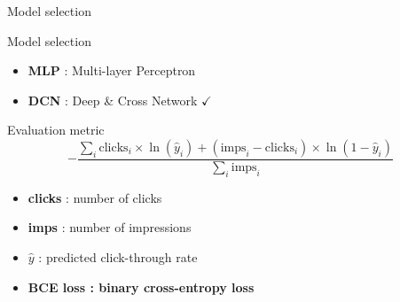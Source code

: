 \documentclass[compress,xcolor=table]{beamer}
\begin{document}
\begin{frame}{Model selection}
	\begin{block}{Model selection}
		\begin{itemize}
			\item \textbf{MLP} : Multi-layer Perceptron \XSolidBrush
			\item \textbf{DCN} : Deep \& Cross Network $\checkmark$
		\end{itemize}
	\end{block}
	\begin{block}{Evaluation metric}
		\begin{equation}
			-\frac{\sum_{i}{\text{clicks}_i \times \ln(\hat{y}_i) + (\text{imps}_i - \text{clicks}_i) \times \ln(1 - \hat{y}_i)}}{\sum_{i}{\text{imps}_i}}
		\end{equation}
		\begin{itemize}
			\item \textbf{clicks} : number of clicks
			\item \textbf{imps} : number of impressions
			\item $\hat{y}$ : predicted click-through rate
			\item \textbf{BCE loss : binary cross-entropy loss}
		\end{itemize}
	\end{block}

\end{frame}
\end{document}
